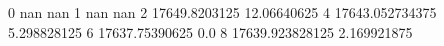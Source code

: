 0 nan nan
1 nan nan
2 17649.8203125 12.06640625
4 17643.052734375 5.298828125
6 17637.75390625 0.0
8 17639.923828125 2.169921875
